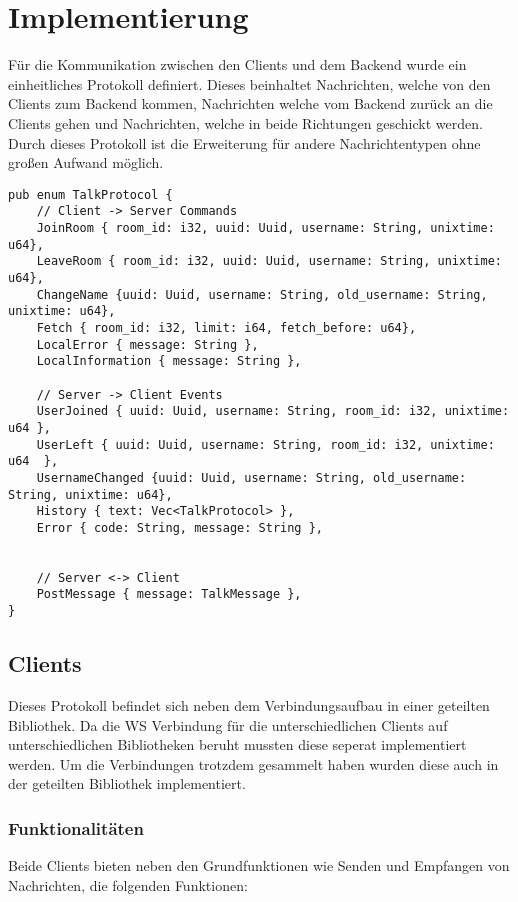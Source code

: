 
\chapter{Implementierung}
Für die Kommunikation zwischen den Clients und dem Backend wurde ein einheitliches Protokoll definiert. Dieses beinhaltet Nachrichten, welche von den Clients zum Backend kommen, Nachrichten welche vom Backend zurück an die Clients gehen und Nachrichten, welche in beide Richtungen geschickt werden. Durch dieses Protokoll ist die Erweiterung für andere Nachrichtentypen ohne großen Aufwand möglich.

\begin{lstlisting}[caption=Kommunikationsprotokoll, label=Kommunikationsprotokoll, basicstyle=\ttfamily\scriptsize]
pub enum TalkProtocol {
    // Client -> Server Commands
    JoinRoom { room_id: i32, uuid: Uuid, username: String, unixtime: u64},
    LeaveRoom { room_id: i32, uuid: Uuid, username: String, unixtime: u64},
    ChangeName {uuid: Uuid, username: String, old_username: String, unixtime: u64},
    Fetch { room_id: i32, limit: i64, fetch_before: u64},
    LocalError { message: String },
    LocalInformation { message: String },

    // Server -> Client Events
    UserJoined { uuid: Uuid, username: String, room_id: i32, unixtime: u64 },
    UserLeft { uuid: Uuid, username: String, room_id: i32, unixtime: u64  },
    UsernameChanged {uuid: Uuid, username: String, old_username: String, unixtime: u64},
    History { text: Vec<TalkProtocol> },
    Error { code: String, message: String },


    // Server <-> Client
    PostMessage { message: TalkMessage },
}
\end{lstlisting}

\section{Clients}
Dieses Protokoll befindet sich neben dem Verbindungsaufbau in einer geteilten Bibliothek. Da die \ac{WS} Verbindung für die unterschiedlichen Clients auf unterschiedlichen Bibliotheken beruht mussten diese seperat implementiert werden. Um die Verbindungen trotzdem gesammelt haben wurden diese auch in der geteilten Bibliothek implementiert.

\subsection{Funktionalitäten}
Beide Clients bieten neben den Grundfunktionen wie Senden und Empfangen von Nachrichten, die folgenden Funktionen:


